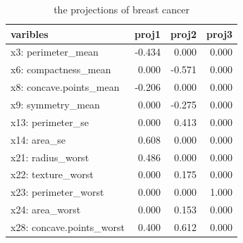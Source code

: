 \documentclass[nojss]{jss}
\numberwithin{equation}{section}
\begin{document}
\begin{table}[t!]
  \centering
    \begin{tabular}{lrrr}
    \toprule
    varibles & proj1 & proj2 & proj3 \\
    \midrule
    x3: perimeter\_mean & -0.434  & 0.000  & 0.000  \\
    x6: compactness\_mean & 0.000  & -0.571  & 0.000  \\
    x8: concave.points\_mean & -0.206  & 0.000  & 0.000  \\
    x9: symmetry\_mean & 0.000  & -0.275  & 0.000  \\
    x13: perimeter\_se & 0.000  & 0.413  & 0.000  \\
    x14: area\_se & 0.608  & 0.000  & 0.000  \\
    x21: radius\_worst & 0.486  & 0.000  & 0.000  \\
    x22: texture\_worst & 0.000  & 0.175  & 0.000  \\
    x23: perimeter\_worst & 0.000  & 0.000  & 1.000  \\
    x24: area\_worst & 0.000  & 0.153  & 0.000  \\
    x28: concave.points\_worst & 0.400  & 0.612  & 0.000  \\
    \bottomrule
    \end{tabular}%
    \caption{the projections of breast cancer}\label{tab:proj}%
\end{table}%





\end{document}
